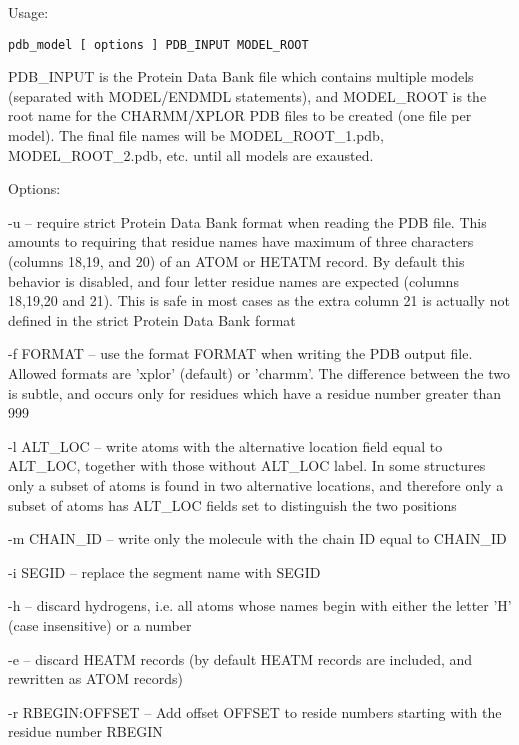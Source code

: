 \begin{description}


\item{Usage:}

{\tt pdb\_model [ options ] PDB\_INPUT MODEL\_ROOT}

 PDB\_INPUT is the Protein Data Bank file which contains
 multiple models (separated with MODEL/ENDMDL statements),
 and MODEL\_ROOT is the root name for the CHARMM/XPLOR
 PDB files to be created (one file per model). The final
 file names will be MODEL\_ROOT\_1.pdb, MODEL\_ROOT\_2.pdb,
 etc. until all models are exausted.


\item{Options:}
\begin{description}
\item -u -- require strict Protein Data Bank format when reading
 the PDB file. This amounts to requiring that residue names
 have maximum of three characters (columns 18,19, and 20) of
 an ATOM or HETATM record. By default this behavior is disabled,
 and four letter residue names are expected (columns 18,19,20
 and 21). This is safe in most cases as the extra column 21 is
 actually not defined in the strict Protein Data Bank format
\item -f FORMAT -- use the format FORMAT when writing the PDB
 output file. Allowed formats are 'xplor' (default) or 'charmm'.
 The difference between the two is subtle, and occurs only for
 residues which have a residue number greater than 999
\item -l ALT\_LOC -- write atoms with the alternative location
 field equal to ALT\_LOC, together with those without ALT\_LOC
 label. In some structures only a subset of atoms is found in
 two alternative locations, and therefore only a subset of atoms
 has ALT\_LOC fields set to distinguish the two positions
\item -m CHAIN\_ID -- write only the molecule with the chain ID
 equal to CHAIN\_ID
\item -i SEGID -- replace the segment name with SEGID
\item -h -- discard hydrogens, i.e. all atoms whose names begin with
 either the letter 'H' (case insensitive) or a number
\item -e -- discard HEATM records (by default HEATM records are
 included, and rewritten as ATOM records)
\item -r RBEGIN:OFFSET -- Add offset OFFSET to reside numbers
 starting with the residue number RBEGIN
\end{description}


\end{description}
